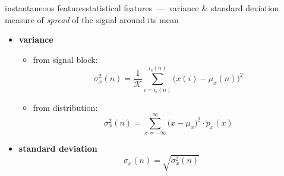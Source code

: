         \begin{frame}{instantaneous features}{statistical features~---~variance \& standard deviation}
			measure of \textit{spread} of the signal around its mean
            
            \begin{itemize}
                \item \textbf{variance}
                    \begin{itemize}
                        \item   from signal block:
                            \begin{equation*}
                                \sigma_x^2(n) = \frac{1}{\mathcal{K}}\sum\limits_{i= i_{\mathrm{s}}(n)}^{i_{\mathrm{e}}(n)}{\big(x(i)-\mu_x(n)\big)^2} 
                            \end{equation*}
                        \pause
                        \item   from distribution:
                            \begin{equation*}
                                \sigma_x^2(n) = \sum\limits_{x=-\infty}^{\infty}{\big(x-\mu_x\big)^2\cdot p_x(x)} 
                            \end{equation*}
                    \end{itemize}
                \pause
                \item \textbf{standard deviation}
                    \begin{equation*}
                        \sigma_x(n) = \sqrt{\sigma_x^2(n)} 
                    \end{equation*}
            \end{itemize}
        \end{frame}
